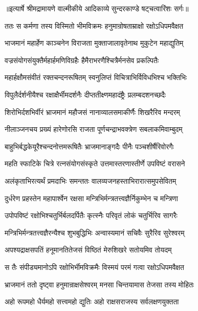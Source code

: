 {॥इत्यार्षे श्रीमद्रामायणे वाल्मीकीये आदिकाव्ये सुन्दरकाण्डे षट्चत्वारिंशः सर्गः॥}


\twolineshloka
{ततः स कर्मणा तस्य विस्मितो भीमविक्रमः}
{हनुमान्रोषताम्राक्षो रक्षोऽधिपमवैक्षत} %

\twolineshloka
{भाजमानं महार्हेण काञ्चनेन विराजता}
{मुक्ताजालावृतेनाथ मुकुटेन महाद्युतिम्} %

\twolineshloka
{वज्रसंयोगसंयुक्तैर्महार्हमणिविग्रहैः}
{हैमैराभरणैश्चित्रैर्मनसेव प्रकल्पितैः} %

\twolineshloka
{महार्हक्षौमसंवीतं रक्तचन्दनरूषितम्}
{स्वनुलिप्तं विचित्राभिर्विविधभिश्च भक्तिभिः} %

\twolineshloka
{विपुलैर्दर्शनीयैश्च रक्षाक्षैर्भीमदर्शनैः}
{दीप्ततीक्ष्णमहादंष्ट्रैः प्रलम्बदशनच्छदैः} %

\twolineshloka
{शिरोभिर्दशभिर्वीरं भ्राजमानं महौजसं}
{नानाव्यालसमाकीर्णैः शिखरैरिव मन्दरम्} %

\twolineshloka
{नीलाञ्जनचय प्रख्यं हारेणोरसि राजता}
{पूर्णचन्द्राभवक्त्रेण सबलाकमिवाम्बुदम्} %

\twolineshloka
{बाहुभिर्बद्धकेयूरैश्चन्दनोत्तमरूषितैः}
{भ्राजमानाङ्गदैः पीनैः पञ्चशीर्षैरिवोरगैः} %

\twolineshloka
{महति स्फाटिके चित्रे रत्नसंयोगसंस्कृते}
{उत्तमास्तरणास्तीर्णे उपविष्टं वरासने} %

\twolineshloka
{अलंकृताभिरत्यर्थं प्रमदाभिः समन्ततः}
{वालव्यजनहस्ताभिरारात्समुपसेवितम्} %

\twolineshloka
{दुर्धरेण प्रहस्तेन महापार्श्वेन रक्षसा}
{मन्त्रिभिर्मन्त्रतत्त्वज्ञैर्निकुम्भेन च मन्त्रिणा} %

\twolineshloka
{उपोपविष्टं रक्षोभिश्चतुर्भिर्बलदर्पितैः}
{कृत्स्नैः परिवृतं लोकं चतुर्भिरिव सागरैः} %

\twolineshloka
{मन्त्रिभिर्मन्त्रतत्त्वज्ञैरन्यैश्च शुभबुद्धिभिः}
{अन्वास्यमानं सचिवैः सुरैरिव सुरेश्वरम्} %

\twolineshloka
{अपश्यद्राक्षसपतिं हनूमानतितेजसं}
{विष्ठितं मेरुशिखरे सतोयमिव तोयदम्} %

\twolineshloka
{स तैः संपीड्यमानोऽपि रक्षोभिर्भीमविक्रमैः}
{विस्मयं परमं गत्वा रक्षोऽधिपमवैक्षत} %

\twolineshloka
{भ्राजमानं ततो दृष्ट्वा हनुमान्राक्षसेश्वरम्}
{मनसा चिन्तयामास तेजसा तस्य मोहितः} %

\twolineshloka
{अहो रूपमहो धैर्यमहो सत्त्वमहो द्युतिः}
{अहो राक्षसराजस्य सर्वलक्षणयुक्तता} %

